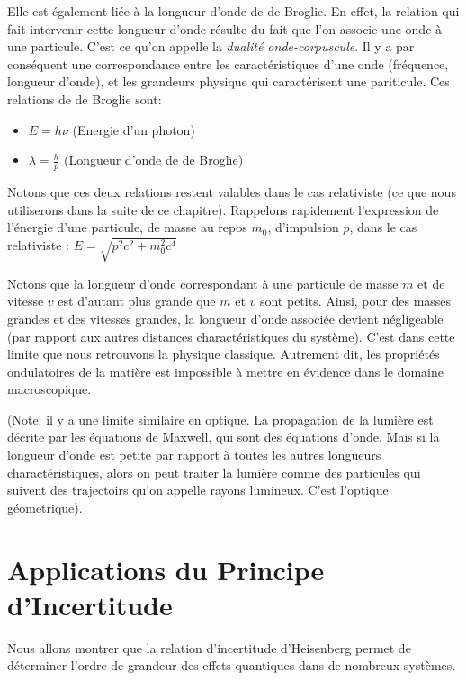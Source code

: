\documentclass{book}
\begin{document}
Elle est également liée à la longueur d'onde de de Broglie. En effet, la relation qui fait intervenir cette longueur d'onde résulte du fait que l'on associe une onde à une particule. C'est ce qu'on appelle la \textit{dualité onde-corpuscule}. 
Il y a par conséquent une correspondance entre les caractéristiques d'une onde (fréquence, longueur d'onde), et les grandeurs physique qui caractérisent une pariticule.
Ces relations de de Broglie sont:
\begin{itemize}
    \item $E = h \nu$ (Energie d'un photon)\\
    \item $\lambda = \frac{h}{p}$ (Longueur d'onde de de Broglie)
\end{itemize}

Notons que ces deux relations restent valables dans le cas relativiste (ce que nous utiliserons dans la suite de ce chapitre).
Rappelons rapidement l'expression de l'énergie d'une particule, de masse au repos $m_0$, d'impulsion $p$, dans le cas relativiste : $E = \sqrt{p^2c^2 + m_0^2c^4}$

 Notons que la longueur d'onde correspondant à une particule de masse $m$ et de vitesse $v$ est d'autant plus grande que $m$ et $v$ sont petits. Ainsi, pour des masses grandes et des vitesses grandes, la longueur d'onde associée devient négligeable (par rapport aux autres distances charactéristiques du système). C'est dans cette limite que nous  retrouvons la physique classique. Autrement dit, les propriétés ondulatoires de la matière est impossible à mettre en évidence dans le domaine macroscopique.  
 
(Note: il y a une limite similaire en optique. La propagation de la lumière est décrite par les équations de Maxwell, qui sont des équations d'onde. Mais si la longueur d'onde est petite par rapport à toutes les autres longueurs charactéristiques, alors on peut traiter la lumière comme des particules qui suivent des trajectoirs qu'on appelle rayons lumineux. C'est l'optique géometrique).
 


\section{Applications du Principe d'Incertitude}

Nous allons montrer que la relation d'incertitude d'Heisenberg permet de déterminer l'ordre de grandeur des effets quantiques dans de nombreux systèmes. 
\end{document}
